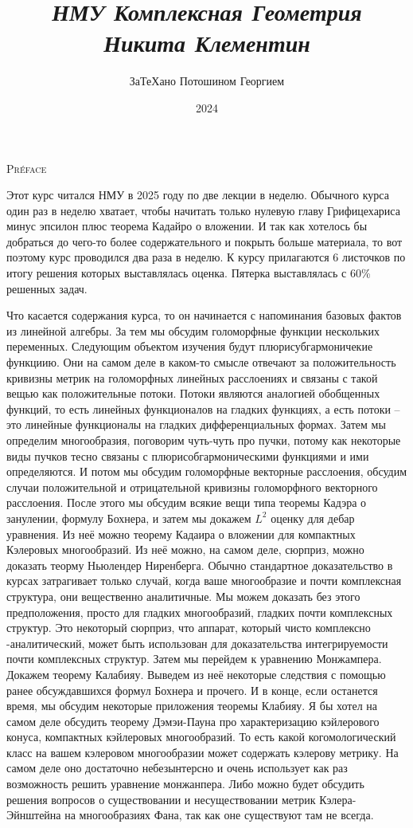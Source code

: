 \documentclass[a4paper, 12pt, oneside]{book}
\title{
\textit{\huge{НМУ Комплексная Геометрия\\Никита Клементин}}
}
\date{2024}
\author{\small{ЗаТеХано Потошином Георгием}}
\begin{document}
\maketitle

\begin{center}\textsc{\Large{Préface}}\end{center}

Этот курс читался НМУ в 2025 году по две лекции в неделю. Обычного курса один раз
в неделю хватает, чтобы начитать только нулевую главу Грифицехариса минус эпсилон
плюс теорема Кадайро о вложении. И так как хотелось бы добраться до чего-то более
содержательного и покрыть больше материала, то вот поэтому курс проводился два
раза в неделю. К курсу прилагаются 6 листочков по итогу решения которых выставлялась
оценка. Пятерка выставлялась с 60\% решенных задач. 

Что касается содержания курса, то он начинается с напоминания базовых фактов из
линейной алгебры. За тем мы обсудим голоморфные функции нескольких переменных.
Следующим объектом изучения будут плюрисубгармоничекие функциию. Они на самом
деле в каком-то смысле отвечают за положительность кривизны метрик на голоморфных
линейных расслоениях и связаны с такой вещью как положительные потоки. Потоки
являются аналогией обобщенных функций, то есть линейных функционалов на гладких
функциях, а есть потоки – это линейные функционалы на гладких дифференциальных
формах. Затем мы определим многообразия, поговорим чуть-чуть про пучки, потому
как некоторые виды пучков тесно связаны с плюрисобгармоническими функциями и ими
определяются. И потом мы обсудим голоморфные векторные расслоения, обсудим
случаи положительной и отрицательной кривизны голоморфного векторного расслоения.
После этого мы обсудим всякие вещи типа теоремы Кадэра о занулении, формулу
Бохнера, и затем мы докажем $L^2$ оценку для дебар уравнения. Из неё можно
теорему Кадаира о вложении для компактных Кэлеровых многообразий. Из неё можно,
на самом деле, сюрприз, можно доказать теорму Ньюлендер Ниренберга. Обычно 
стандартное доказательство в курсах затрагивает только случай, когда ваше
многообразие и почти комплексная структура, они вещественно аналитичные. Мы можем
доказать без этого предположения, просто для гладких многообразий, гладких почти
комплексных структур. Это некоторый сюрприз, что аппарат, который чисто комплексно
-аналитический, может быть использован для доказательства интегрируемости почти
комплексных структур. Затем мы перейдем к уравнению Монжампера. Докажем теорему
Калабияу. Выведем из неё некоторые следствия с помощью ранее обсуждавшихся формул
Бохнера и прочего. И в конце, если останется время, мы обсудим некоторые приложения
теоремы Клабияу. Я бы хотел на самом деле обсудить теорему Дэмэи-Пауна про
характеризацию кэйлерового конуса, компактных кэйлеровых многообразий. То есть
какой когомологический класс на вашем кэлеровом многообразии может содержать
кэлерову метрику. На самом деле оно достаточно небезынтерсно и очень использует
как раз возможность решить уравнение монжанпера. Либо можно будет обсудить решения
вопросов о существовании и несуществовании метрик Кэлера-Эйнштейна на многообразиях
Фана, так как оне существуют там не всегда.






\end{document}
